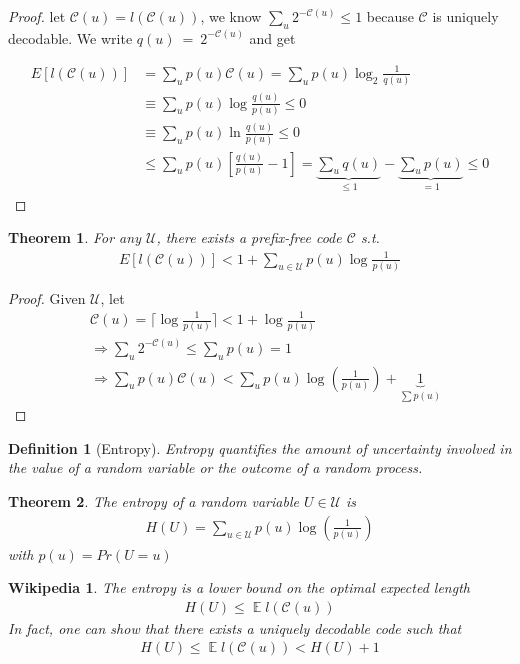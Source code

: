 \documentclass{article}
\newtheorem{theorem}{Theorem}[section]
\newtheorem*{wikipedia}{Wikipedia}
\newtheorem{definition}{Definition}[section]
\theoremstyle{definition} %
\def\U{\mathcal{U}}
\def\C{\mathscr{C}}
\DeclareMathOperator{\E}{\mathbb{E}}%
\begin{document}
\begin{proof}
  let $\C(u) = l(\C(u))$, we know $\sum_u 2^{-\C(u)} \leq 1$ because $\C$ is uniquely decodable. We write $q(u)~=~2^{-\C(u)}$ and get

  \begin{align*}
    E[l(\C(u))] &= \sum_u p(u) \C(u) = \sum_u p(u) \log_2\frac{1}{q(u)} \\
    &\equiv \sum_u p(u) \log\frac{q(u)}{p(u)} \leq 0 \\
    &\equiv \sum_u p(u) \ln\frac{q(u)}{p(u)} \leq 0 \\
    &\leq \sum_u p(u) \left[\frac{q(u)}{p(u)} - 1\right]
    = \underbrace{\sum_u q(u)}_{\leq 1} - \underbrace{\sum_u p(u)}_{=1} \leq 0
  \end{align*}
\end{proof}

\begin{theorem}
  For any $\U$, there exists a prefix-free code $\C$ s.t.
  \begin{align*}
    E[l(\C(u))] < 1 + \sum_{u \in \U} p(u) \log\frac{1}{p(u)}
  \end{align*}
\end{theorem}
\begin{proof}
  Given $\U$, let
  \begin{align*}
    &\C(u) = \lceil \log\frac{1}{p(u)} \rceil < 1 + \log \frac{1}{p(u)} \\
    &\Rightarrow \sum_u 2^{-\C(u)} \leq \sum_u p(u) = 1 \\
    &\Rightarrow \sum_u p(u) \C(u) < \sum_u p(u) \log(\frac{1}{p(u)}) + \underbrace{1}_{\sum p(u)}
  \end{align*}
\end{proof}

\begin{definition}[Entropy]
  Entropy quantifies the amount of uncertainty involved in the value of a random variable or the outcome of a random process.
\end{definition}

\begin{theorem}
  The entropy of a random variable $U \in \U$ is
  \begin{align*}
    H(U) = \sum_{u \in \U} p(u) \log(\frac{1}{p(u)})
  \end{align*}
  with $p(u) = Pr(U = u)$
\end{theorem}

\begin{wikipedia}
  The entropy is a lower bound on the optimal expected length
  \begin{align*}
    H(U) \leq \E{l(\C(u))}
  \end{align*}
  In fact, one can show that there exists a uniquely decodable code such that
  \begin{align*}
     H(U) \leq \E{l(\C(u))} < H(U) + 1
   \end{align*}
\end{wikipedia}
\end{document}
